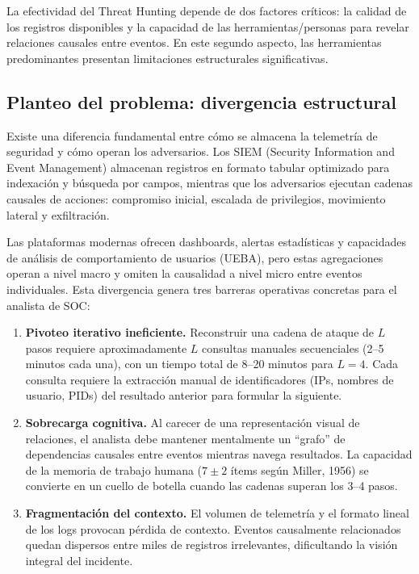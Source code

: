 \documentclass[11pt,a4paper]{article}
\begin{document}
La efectividad del Threat Hunting depende de dos factores críticos: la calidad
de los registros disponibles y la capacidad de las herramientas/personas para
revelar relaciones causales entre eventos. En este segundo aspecto, las
herramientas predominantes presentan limitaciones estructurales significativas.

\subsection{Planteo del problema: divergencia estructural}
Existe una diferencia fundamental entre cómo se almacena la telemetría de
seguridad y cómo operan los adversarios. Los SIEM (Security Information and
Event Management) almacenan registros en formato tabular optimizado para
indexación y búsqueda por campos, mientras que los adversarios ejecutan cadenas
causales de acciones: compromiso inicial, escalada de privilegios, movimiento
lateral y exfiltración.

Las plataformas modernas ofrecen dashboards, alertas estadísticas y capacidades
de análisis de comportamiento de usuarios (UEBA), pero estas agregaciones
operan a nivel macro y omiten la causalidad a nivel micro entre eventos
individuales. Esta divergencia genera tres barreras operativas concretas para
el analista de SOC:

\begin{enumerate}[leftmargin=*]
  \item \textbf{Pivoteo iterativo ineficiente.} Reconstruir una cadena de
  ataque de $L$ pasos requiere aproximadamente $L$ consultas manuales
  secuenciales (2--5 minutos cada una), con un tiempo total de 8--20 minutos
  para $L = 4$. Cada consulta requiere la extracción manual de identificadores
  (IPs, nombres de usuario, PIDs) del resultado anterior para formular la
  siguiente.
  \item \textbf{Sobrecarga cognitiva.} Al carecer de una representación visual
  de relaciones, el analista debe mantener mentalmente un ``grafo'' de
  dependencias causales entre eventos mientras navega resultados. La capacidad
  de la memoria de trabajo humana ($7 \pm 2$ ítems según Miller, 1956) se
  convierte en un cuello de botella cuando las cadenas superan los 3--4 pasos.
  \item \textbf{Fragmentación del contexto.} El volumen de telemetría y el
  formato lineal de los logs provocan pérdida de contexto. Eventos causalmente
  relacionados quedan dispersos entre miles de registros irrelevantes,
  dificultando la visión integral del incidente.
\end{enumerate}
\end{document}

